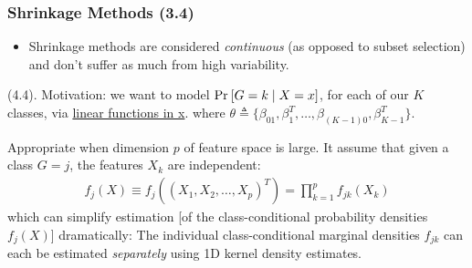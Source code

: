 \documentclass[12pt]{article}
\newcommand\p{\Needspace{10\baselineskip} \noindent}
\begin{document}
\subsubsection{Shrinkage Methods (3.4)}
\begin{itemize}
	\item Shrinkage methods are considered \textit{continuous} (as opposed to subset selection) and don't suffer as much from high variability. 
\end{itemize}





\p {} (4.4). Motivation: we want to model $\text{Pr}_{}\left[G = k \mid X = x\right]$, for each of our $K$ classes, via \underline{linear functions in x}. 
where $\theta \triangleq \{\beta_{01}, \beta_1^T, \ldots, \beta_{(K-1)0}, \beta_{K-1}^T \}$. 




\p Appropriate when dimension $p$ of feature space is large. It assume that given a class $G = j$, the features $X_k$ are independent:
\begin{align}
	f_j(X) \equiv f_j((X_1, X_2, \ldots, X_p)^T) = \prod_{k = 1}^{p} f_{jk}(X_k)
\end{align}
which can simplify estimation [of the class-conditional probability densities $f_j(X)$] dramatically: The individual class-conditional marginal densities $f_{jk}$ can each be estimated \textit{separately} using 1D kernel density estimates. 
\end{document}
